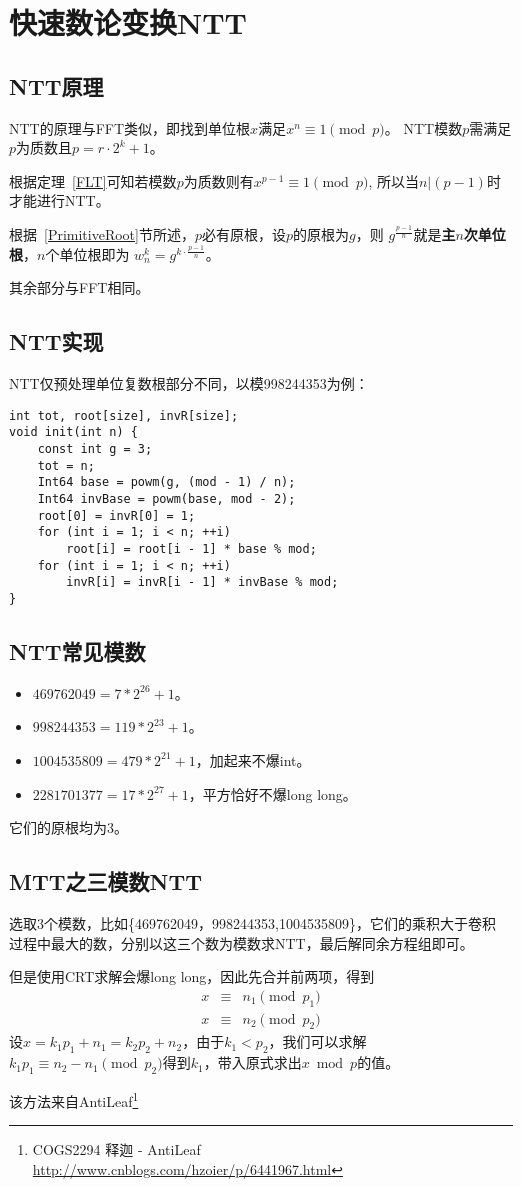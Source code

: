 \section{快速数论变换NTT}
\subsection{NTT原理}
NTT的原理与FFT类似，即找到单位根$x$满足$x^n\equiv 1 \pmod{p}$。
NTT模数$p$需满足$p$为质数且$p=r\cdot 2^k+1$。

根据定理~\ref{FLT}可知若模数$p$为质数则有$x^{p-1}\equiv 1 \pmod{p}$,
所以当$n|(p-1)$时才能进行NTT。

根据~\ref{PrimitiveRoot}节所述，$p$必有原根，设$p$的原根为$g$，则
$g^\frac{p-1}{n}$就是{\bfseries 主$n$次单位根}，$n$个单位根即为
$w_n^k=g^{k\cdot \frac{p-1}{n}}$。

其余部分与FFT相同。

\subsection{NTT实现}
NTT仅预处理单位复数根部分不同，以模998244353为例：
\begin{lstlisting}
int tot, root[size], invR[size];
void init(int n) {
    const int g = 3;
    tot = n;
    Int64 base = powm(g, (mod - 1) / n);
    Int64 invBase = powm(base, mod - 2);
    root[0] = invR[0] = 1;
    for (int i = 1; i < n; ++i)
        root[i] = root[i - 1] * base % mod;
    for (int i = 1; i < n; ++i)
        invR[i] = invR[i - 1] * invBase % mod;
}
\end{lstlisting}
\subsection{NTT常见模数}
\begin{itemize}
    \item $469762049=7*2^26+1$。
    \item $998244353=119*2^23+1$。
    \item $1004535809=479*2^21+1$，加起来不爆int。
    \item $2281701377=17*2^27+1$，平方恰好不爆long long。
\end{itemize}
它们的原根均为3。
\subsection{MTT之三模数NTT}
选取3个模数，比如\{469762049，998244353,1004535809\}，它们的乘积大于卷积
过程中最大的数，分别以这三个数为模数求NTT，最后解同余方程组即可。

但是使用CRT求解会爆long long，因此先合并前两项，得到
\begin{eqnarray*}
    x&\equiv&n_1 \pmod{p_1}\\
    x&\equiv&n_2 \pmod{p_2}
\end{eqnarray*}
设$x=k_1p_1+n_1=k_2p_2+n_2$，由于$k_1<p_2$，我们可以求解
$k_1p_1\equiv n_2-n_1 \pmod{p_2}$得到$k_1$，带入原式求出$x \bmod{p}$的值。

该方法来自AntiLeaf\footnote{COGS2294 释迦 - AntiLeaf
\url{http://www.cnblogs.com/hzoier/p/6441967.html}}
